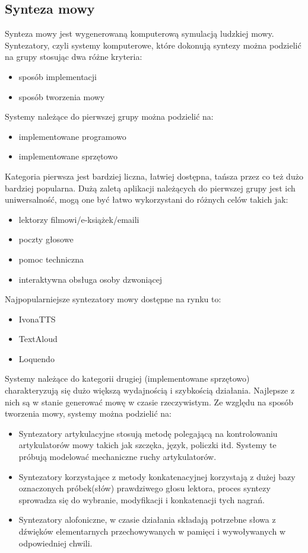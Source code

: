 \subsection{Synteza mowy}   
Synteza mowy jest wygenerowaną komputerową symulacją ludzkiej mowy. Syntezatory, czyli systemy komputerowe, które dokonują syntezy można podzielić na grupy stosując dwa różne kryteria:
\begin{itemize}
	\item sposób implementacji
	\item sposób tworzenia mowy
\end{itemize}
Systemy należące do pierwszej grupy można podzielić na:
\begin{itemize}
	\item implementowane programowo
	\item implementowane sprzętowo
\end{itemize}
Kategoria pierwsza jest bardziej liczna, łatwiej dostępna, tańsza przez co też dużo bardziej popularna. Dużą zaletą aplikacji należących do pierwszej grupy jest ich uniwersalność,  mogą one być łatwo wykorzystani do różnych celów takich jak:
\begin{itemize}
	\item lektorzy filmowi/e-książek/emaili
	\item poczty głosowe
	\item pomoc techniczna
	\item interaktywna obsługa osoby  dzwoniącej
\end{itemize}
Najpopularniejsze syntezatory mowy dostępne na rynku to:
\begin{itemize}
	\item IvonaTTS
	\item TextAloud
	\item Loquendo
\end{itemize}
Systemy należące do kategorii drugiej (implementowane sprzętowo) charakteryzują się dużo większą wydajnością i szybkością działania. Najlepsze z nich są w stanie generować mowę w czasie rzeczywistym. 
Ze względu na sposób tworzenia mowy, systemy można podzielić na:
\begin{itemize}
	\item Syntezatory artykulacyjne stosują metodę polegającą na kontrolowaniu artykulatorów mowy takich jak szczęka, język, policzki itd. Systemy te próbują modelować mechaniczne ruchy artykulatorów.
	\item Syntezatory korzystające z metody konkatenacyjnej korzystają z dużej bazy oznaczonych próbek(słów) prawdziwego głosu lektora, proces syntezy sprowadza się do wybranie, modyfikacji i konkatenacji tych nagrań. 
	\item Syntezatory alofoniczne, w czasie działania składają potrzebne słowa z dźwięków elementarnych przechowywanych w pamięci i wywoływanych w odpowiedniej chwili. 
\end{itemize}
